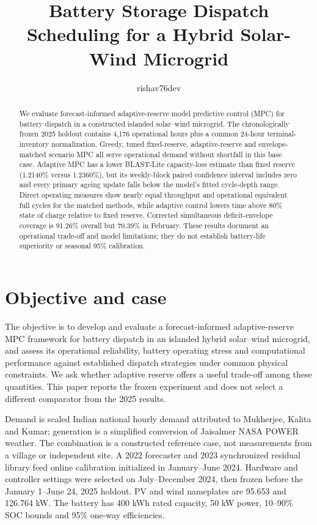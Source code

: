 \documentclass[journal]{IEEEtran}
\title{Battery Storage Dispatch Scheduling for a Hybrid Solar-Wind Microgrid}
\author{rishav76dev}
\date{}
\begin{document}
\maketitle
\begin{abstract}
We evaluate forecast-informed adaptive-reserve model predictive control (MPC) for battery dispatch in a constructed islanded solar--wind microgrid. The chronologically frozen 2025 holdout contains 4,176 operational hours plus a common 24-hour terminal-inventory normalization. Greedy, tuned fixed-reserve, adaptive-reserve and envelope-matched scenario MPC all serve operational demand without shortfall in this base case. Adaptive MPC has a lower BLAST-Lite capacity-loss estimate than fixed reserve (1.2140\% versus 1.2360\%), but its weekly-block paired confidence interval includes zero and every primary ageing update falls below the model's fitted cycle-depth range. Direct operating measures show nearly equal throughput and operational equivalent full cycles for the matched methods, while adaptive control lowers time above 80\% state of charge relative to fixed reserve. Corrected simultaneous deficit-envelope coverage is 91.26\% overall but 70.39\% in February. These results document an operational trade-off and model limitations; they do not establish battery-life superiority or seasonal 95\% calibration.
\end{abstract}

\section{Objective and case}
The objective is to develop and evaluate a forecast-informed adaptive-reserve MPC framework for battery dispatch in an islanded hybrid solar--wind microgrid, and assess its operational reliability, battery operating stress and computational performance against established dispatch strategies under common physical constraints. We ask whether adaptive reserve offers a useful trade-off among these quantities. This paper reports the frozen experiment and does not select a different comparator from the 2025 results.

Demand is scaled Indian national hourly demand attributed to Mukherjee, Kalita and Kumar\cite{demand}; generation is a simplified conversion of Jaisalmer NASA POWER weather\cite{power}. The combination is a constructed reference case, not measurements from a village or independent site. A 2022 forecaster and 2023 synchronized residual library feed online calibration initialized in January--June 2024. Hardware and controller settings were selected on July--December 2024, then frozen before the January 1--June 24, 2025 holdout. PV and wind nameplates are 95.653 and 126.764 kW. The battery has 400 kWh rated capacity, 50 kW power, 10--90\% SOC bounds and 95\% one-way efficiencies.
\end{document}
